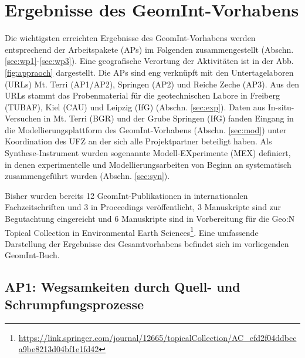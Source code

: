 \chapter*{Ergebnisse des GeomInt-Vorhabens}

Die wichtigsten erreichten Ergebnisse des GeomInt-Vorhabens werden entsprechend der Arbeitspakete (APs) im Folgenden zusammengestellt (Abschn. \ref{sec:wp1}-\ref{sec:wp3}). Eine geografische Verortung der Aktivitäten ist in der Abb. \ref{fig:appraoch} dargestellt. Die APs sind eng verknüpft mit den Untertagelaboren (URLs) Mt. Terri (AP1/AP2), Springen (AP2) und Reiche Zeche (AP3). Aus den URLs stammt das Probenmaterial für die geotechnischen Labore in Freiberg (TUBAF), Kiel (CAU) und Leipzig (IfG) (Abschn. \ref{sec:exp}). Daten aus In-situ-Versuchen in Mt. Terri (BGR) und der Grube Springen (IfG) fanden Eingang in die Modellierungsplattform des GeomInt-Vorhabens (Abschn. \ref{sec:mod}) unter Koordination des UFZ an der sich alle Projektpartner beteiligt haben.
Als Synthese-Instrument wurden sogenannte Modell-EXperimente (MEX) definiert, in denen experimentelle und Modellierungsarbeiten von Beginn an systematisch zusammengeführt wurden (Abschn. \ref{sec:syn}). 

Bisher wurden bereits 12 GeomInt-Publikationen in internationalen Fachzeitschriften und 3 in Proccedings veröffentlicht, 3 Manuskripte sind zur Begutachtung eingereicht und 6 Manuskripte sind in Vorbereitung für die Geo:N Topical Collection in Environmental Earth  Sciences\footnote{\url{https://link.springer.com/journal/12665/topicalCollection/AC_efd2f04ddbcca9be8213d04bf1e1fd42}}. Eine umfassende Darstellung der Ergebnisse des Gesamtvorhabens befindet sich im vorliegenden GeomInt-Buch.
\section*{AP1: Wegsamkeiten durch Quell- und Schrumpfungsprozesse}
\label{sec:wp1}

